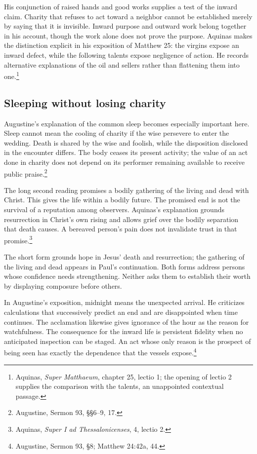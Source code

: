 His conjunction of raised hands and good works supplies a test of the inward claim. Charity that refuses to act toward a neighbor cannot be established merely by saying that it is invisible. Inward purpose and outward work belong together in his account, though the work alone does not prove the purpose. Aquinas makes the distinction explicit in his exposition of Matthew 25: the virgins expose an inward defect, while the following talents expose negligence of action. He records alternative explanations of the oil and sellers rather than flattening them into one.\footnote{Aquinas, \textit{Super Matthaeum}, chapter 25, lectio 1; the opening of lectio 2 supplies the comparison with the talents, an unappointed contextual passage.}

\subsection{Sleeping without losing charity}
Augustine's explanation of the common sleep becomes especially important here. Sleep cannot mean the cooling of charity if the wise persevere to enter the wedding. Death is shared by the wise and foolish, while the disposition disclosed in the encounter differs. The body ceases its present activity; the value of an act done in charity does not depend on its performer remaining available to receive public praise.\footnote{Augustine, Sermon 93, §§6--9, 17.}

The long second reading promises a bodily gathering of the living and dead with Christ. This gives the life within a bodily future. The promised end is not the survival of a reputation among observers. Aquinas's explanation grounds resurrection in Christ's own rising and allows grief over the bodily separation that death causes. A bereaved person's pain does not invalidate trust in that promise.\footnote{Aquinas, \textit{Super I ad Thessalonicenses}, 4, lectio 2.}

The short form grounds hope in Jesus' death and resurrection; the gathering of the living and dead appears in Paul's continuation. Both forms address persons whose confidence needs strengthening. Neither asks them to establish their worth by displaying composure before others.

In Augustine's exposition, midnight means the unexpected arrival. He criticizes calculations that successively predict an end and are disappointed when time continues. The acclamation likewise gives ignorance of the hour as the reason for watchfulness. The consequence for the inward life is persistent fidelity when no anticipated inspection can be staged. An act whose only reason is the prospect of being seen has exactly the dependence that the vessels expose.\footnote{Augustine, Sermon 93, §8; Matthew 24:42a, 44.}

